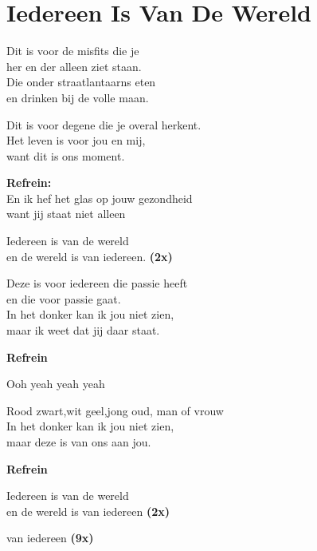 \section{Iedereen Is Van De Wereld}

Dit is voor de misfits die je \\
her en der alleen ziet staan.\\
Die onder straatlantaarns eten \\
en drinken bij de volle maan. 

Dit is voor degene die je overal herkent. \\
Het leven is voor jou en mij, \\
want dit is ons moment.

\textbf{Refrein:}\\
En ik hef het glas op jouw gezondheid\\
want jij staat niet alleen 

Iedereen is van de wereld \\
en de wereld is van iedereen. \textbf{(2x)}

Deze is voor iedereen die passie heeft \\
en die voor passie gaat. \\
In het donker kan ik jou niet zien,\\
maar ik weet dat jij daar staat. 

\textbf{Refrein}

Ooh yeah yeah yeah 

Rood zwart,wit geel,jong oud, man of vrouw \\
In het donker kan ik jou niet zien, \\
maar deze is van ons aan jou.

\textbf{Refrein}

Iedereen is van de wereld \\
en de wereld is van iedereen \textbf{(2x)}

van iedereen \textbf{(9x)}
